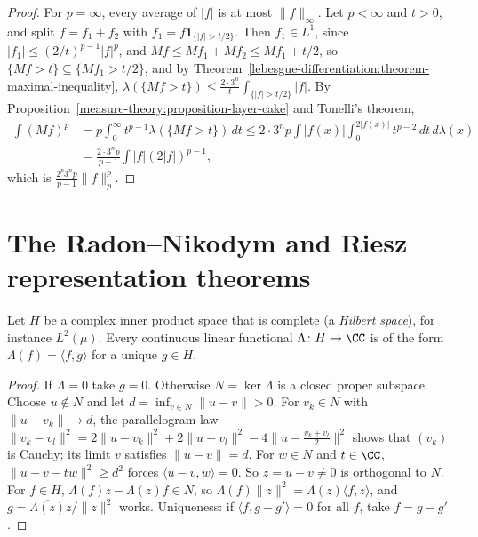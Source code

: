 \begin{proof}
For $p = \infty$, every average of $|f|$ is at most $\|f\|_\infty$. Let $p < \infty$ and $t > 0$, and split $f = f_1 + f_2$ with $f_1 = f\mathbf{1}_{\{|f| > t/2\}}$. Then $f_1 \in L^1$,
since $|f_1| \leq (2/t)^{p-1}|f|^p$, and $Mf \leq Mf_1 + Mf_2 \leq Mf_1 + t/2$, so $\{Mf > t\} \subseteq \{Mf_1 > t/2\}$, and by
Theorem~\ref{lebesgue-differentiation:theorem-maximal-inequality}, $\lambda(\{Mf > t\}) \leq \frac{2 \cdot 3^n}{t}\int_{\{|f| > t/2\}}|f|$. By
Proposition~\ref{measure-theory:proposition-layer-cake} and Tonelli's theorem,
\[\begin{aligned}
\int(Mf)^p &= p\int_0^\infty t^{p-1}\lambda(\{Mf > t\})\,dt \leq 2 \cdot 3^np\int|f(x)|\int_0^{2|f(x)|}t^{p-2}\,dt\,d\lambda(x) \\
&= \frac{2 \cdot 3^np}{p - 1}\int|f|(2|f|)^{p-1},
\end{aligned}\]
which is $\frac{2^p3^np}{p - 1}\|f\|_p^p$.
\end{proof}

\section{The Radon--Nikodym and Riesz representation theorems}\label{lebesgue-differentiation:section-radon-nikodym}

\begin{lemma}\label{lebesgue-differentiation:lemma-hilbert-riesz}
Let $H$ be a complex inner product space that is complete (a \emph{Hilbert space}), for instance $L^2(\mu)$. Every continuous linear functional $\Lambda \colon H \to \CC$ is of the form $\Lambda(f) = \langle f, g \rangle$
for a unique $g \in H$.
\end{lemma}

\begin{proof}
If $\Lambda = 0$ take $g = 0$. Otherwise $N = \ker\Lambda$ is a closed proper subspace. Choose $u \notin N$ and let $d = \inf_{v \in N}\|u - v\| > 0$. For $v_k \in N$ with $\|u - v_k\| \to d$, the parallelogram law
$\|v_k - v_l\|^2 = 2\|u - v_k\|^2 + 2\|u - v_l\|^2 - 4\|u - \frac{v_k + v_l}{2}\|^2$ shows that $(v_k)$ is Cauchy; its limit $v$ satisfies $\|u - v\| = d$. For $w \in N$ and $t \in \CC$,
$\|u - v - tw\|^2 \geq d^2$ forces $\langle u - v, w \rangle = 0$. So $z = u - v \neq 0$ is orthogonal to $N$. For $f \in H$, $\Lambda(f)z - \Lambda(z)f \in N$, so $\Lambda(f)\|z\|^2 = \Lambda(z)\langle f, z \rangle$, and
$g = \overline{\Lambda(z)}z/\|z\|^2$ works. Uniqueness: if $\langle f, g - g' \rangle = 0$ for all $f$, take $f = g - g'$.
\end{proof}

